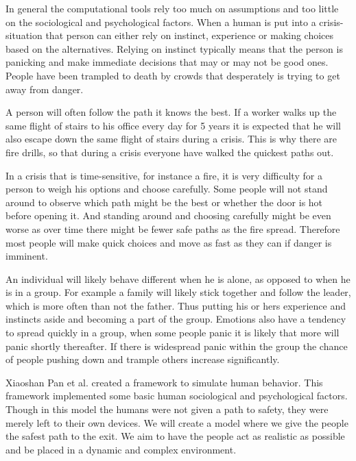 In general the computational tools rely too much on assumptions and too little on the sociological and psychological  
factors. When a human is put into a crisis-situation that person can either rely on instinct, experience or making  
choices based on the alternatives. Relying on instinct typically means that the person is panicking and make immediate  
decisions that may or may not be good ones. People have been trampled to death by crowds that desperately is trying  
to get away from danger. 
 
A person will often follow the path it knows the best. If a worker walks up the same flight of stairs to his office  
every day for 5 years it is expected that he will also escape down the same flight of stairs during a crisis. This  
is why there are fire drills, so that during a crisis everyone have walked the quickest paths out. 
 
In a crisis that is time-sensitive, for instance a fire, it is very difficulty for a person to weigh his options and  
choose carefully. Some people will not stand around to observe which path might be the best or whether the  
door is hot before opening it. And standing around and choosing carefully might be even worse as  
over time there might be fewer safe paths as the fire spread. Therefore most people will make quick choices 
and move as fast as they can if danger is imminent. 
 
An individual will likely behave different when he is alone, as opposed to when he is in a group. For example  
a family will likely stick together and follow the leader, which is more often than not the father. Thus putting  
his or hers experience and instincts aside and becoming a part of the group. Emotions also have a tendency  
to spread quickly in a group, when some people panic it is likely that more will panic shortly thereafter. If  
there is widespread panic within the group the chance of people pushing down and trample others increase  
significantly. 
 
Xiaoshan Pan et al. created a framework to simulate human behavior. This framework implemented some 
basic human sociological and psychological factors. Though in this model the humans were not given a path 
to safety, they were merely left to their own devices. We will create a model where we give the people the 
safest path to the exit. We aim to have the people act as realistic as possible and be placed in a dynamic 
and complex environment.
 
 

